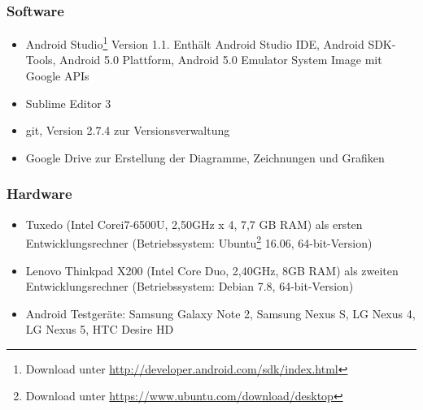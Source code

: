 \subsubsection{Software}
\begin{itemize}
	\item Android Studio\footnote{ Download unter \url{http://developer.android.com/sdk/index.html}} Version 1.1. Enthält Android Studio IDE, Android \gls{SDK}-Tools, Android 5.0 Plattform, Android 5.0 Emulator System Image mit Google \glspl{API}
	\item Sublime Editor 3
	\item git, Version 2.7.4 zur Versionsverwaltung
	\item Google Drive zur Erstellung der Diagramme, Zeichnungen und Grafiken
\end{itemize}
\subsubsection{Hardware}
\begin{itemize}
	\item Tuxedo (Intel\textsuperscript{\textregistered} Core\texttrademark i7-6500U, 2,50GHz x 4, 7,7 GB RAM) als ersten Entwicklungsrechner
	(Betriebssystem: Ubuntu\footnote{ Download unter \url{https://www.ubuntu.com/download/desktop}} 16.06, 64-bit-Version)
	\item Lenovo Thinkpad X200 (Intel\textsuperscript{\textregistered} Core Duo, 2,40GHz, 8GB RAM) als zweiten Entwicklungsrechner (Betriebssystem: Debian 7.8, 64-bit-Version)
	\item Android Testgeräte: Samsung Galaxy Note 2, Samsung Nexus S, LG Nexus 4, LG Nexus 5, HTC Desire HD
\end{itemize}
